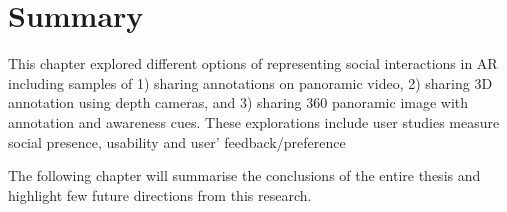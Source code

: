 \section{Summary}

This chapter explored different options of representing social interactions in AR including samples of 1) sharing annotations on panoramic video, 2) sharing 3D annotation using depth cameras, and 3) sharing 360 panoramic image with annotation and awareness cues. These explorations include user studies measure social presence, usability and user' feedback/preference 

The following chapter will summarise the conclusions of the entire thesis and highlight few future directions from this research.

